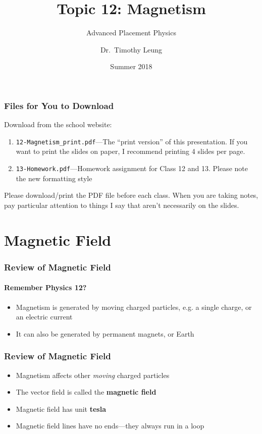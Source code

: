 \documentclass[12pt,aspectratio=169]{beamer}
\title{Topic 12: Magnetism}
\subtitle{Advanced Placement Physics}
\author[TML]{Dr.\ Timothy Leung}
\institute{Olympiads School}
\date{Summer 2018}
\begin{document}
\begin{frame}
  \maketitle
\end{frame}



\begin{frame}
  \frametitle{Files for You to Download}
  Download from the school website:
  \begin{enumerate}
  \item\texttt{12-Magnetism\_print.pdf}---The ``print version'' of this
    presentation. If you want to print the slides on paper, I recommend
    printing 4 slides per page.
  \item\texttt{13-Homework.pdf}---Homework assignment for Class 12 and 13.
    Please note the new formatting style
  \end{enumerate}

  \vspace{.2in}Please download/print the PDF file before each class. When you
  are taking notes, pay particular attention to things I say that aren't
  necessarily on the slides.
\end{frame}



\section{Magnetic Field}

\begin{frame}
  \frametitle{Review of Magnetic Field}
  \framesubtitle{Remember Physics 12?}
  \begin{itemize}
  \item Magnetism is generated by moving charged particles, e.g.
    a single charge, or an electric current
  \item It can also be generated by permanent magnets, or Earth
  \end{itemize}
\end{frame}

\begin{frame}
  \frametitle{Review of Magnetic Field}
  \begin{itemize}
  \item Magnetism affects other \emph{moving} charged particles
  \item The vector field is called the \textbf{magnetic field}
  \item Magnetic field has unit \textbf{tesla}
  \item Magnetic field lines have no ends---they always run in a loop
  \end{itemize}
\end{frame}
\end{document}
